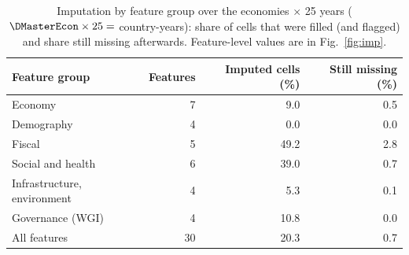 \begin{table}[t]
\caption{Imputation by feature group over the \DMasterEcon{} economies $\times$ 25 years ($\DMasterEcon\times 25=$ \DMasterEconYears{} country-years): share of cells that were filled (and flagged) and share still missing afterwards. Feature-level values are in Fig.~\ref{fig:imp}.}\label{tab:imp}
\centering\small
\begin{tabular}{@{}lrrr@{}}
\toprule
Feature group & Features & Imputed cells (\%) & Still missing (\%) \\
\midrule
Economy & 7 & 9.0 & 0.5 \\
Demography & 4 & 0.0 & 0.0 \\
Fiscal & 5 & 49.2 & 2.8 \\
Social and health & 6 & 39.0 & 0.7 \\
Infrastructure, environment & 4 & 5.3 & 0.1 \\
Governance (WGI) & 4 & 10.8 & 0.0 \\
\midrule
All features & 30 & 20.3 & 0.7 \\
\bottomrule
\end{tabular}
\end{table}
